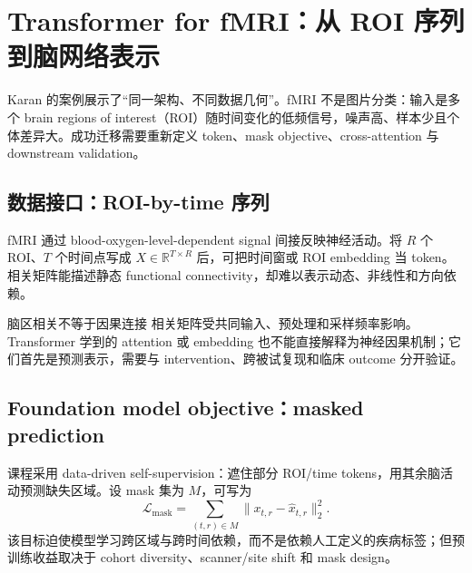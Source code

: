 \section{Transformer for fMRI：从 ROI 序列到脑网络表示}

Karan 的案例展示了“同一架构、不同数据几何”。fMRI 不是图片分类：输入是多个 brain regions of interest（ROI）随时间变化的低频信号，噪声高、样本少且个体差异大。成功迁移需要重新定义 token、mask objective、cross-attention 与 downstream validation。

\subsection{数据接口：ROI-by-time 序列}

fMRI 通过 blood-oxygen-level-dependent signal 间接反映神经活动。将 $R$ 个 ROI、$T$ 个时间点写成 $X\in\mathbb{R}^{T\times R}$ 后，可把时间窗或 ROI embedding 当 token。相关矩阵能描述静态 functional connectivity，却难以表示动态、非线性和方向依赖。







\begin{warningbox}{脑区相关不等于因果连接}
相关矩阵受共同输入、预处理和采样频率影响。Transformer 学到的 attention 或 embedding 也不能直接解释为神经因果机制；它们首先是预测表示，需要与 intervention、跨被试复现和临床 outcome 分开验证。
\end{warningbox}

\subsection{Foundation model objective：masked prediction}

课程采用 data-driven self-supervision：遮住部分 ROI/time tokens，用其余脑活动预测缺失区域。设 mask 集为 $M$，可写为
\[
\mathcal{L}_{\text{mask}}=\sum_{(t,r)\in M}\|x_{t,r}-\hat{x}_{t,r}\|_2^2.
\]
该目标迫使模型学习跨区域与跨时间依赖，而不是依赖人工定义的疾病标签；但预训练收益取决于 cohort diversity、scanner/site shift 和 mask design。




